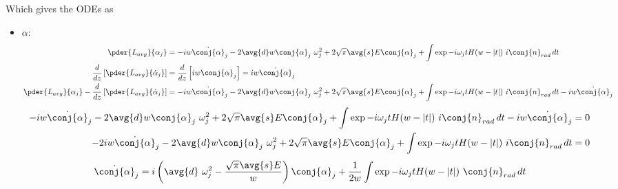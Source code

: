 Which gives the ODEs as
\begin{itemize}
\item $\alpha$:
\begin{equation}
\begin{split}
\pder{L_{avg}}{\alpha_j} &= -iw \dot{\conj{\alpha}}_j - 2 \avg{d} w \conj{\alpha}_j \ \omega_j^2 + 2\sqrt{\pi}\avg{s} E \conj{\alpha}_j + \int{ \exp{-i \omega_j t} H(w-|t|)\ i \conj{n}_{rad}\,dt} \\
\frac{d}{dz}\left[\pder{L_{avg}}{\dot{\alpha}_j}\right] &= \frac{d}{dz} \left[i w \conj{\alpha}_j\right] = i w \dot{\conj{\alpha}}_j\\
\pder{L_{avg}}{\alpha_j} - \frac{d}{dz}\left[\pder{L_{avg}}{\dot{\alpha}_j}\right] &= -iw \dot{\conj{\alpha}}_j - 2 \avg{d} w \conj{\alpha}_j \ \omega_j^2 + 2\sqrt{\pi}\avg{s} E \conj{\alpha}_j + \int{ \exp{-i \omega_j t} H(w-|t|)\ i \conj{n}_{rad}\,dt} - i w \dot{\conj{\alpha}}_j\\
\end{split}
\end{equation}
\begin{equation}
\begin{split}
-iw \dot{\conj{\alpha}}_j - 2 \avg{d} w \conj{\alpha}_j \ \omega_j^2 + 2\sqrt{\pi}\avg{s} E  \conj{\alpha}_j + \int{ \exp{-i \omega_j t} H(w-|t|)\ i \conj{n}_{rad}\,dt} - i w \dot{\conj{\alpha}}_j &= 0 \\
-2iw \dot{\conj{\alpha}}_j - 2 \avg{d} w \conj{\alpha}_j \ \omega_j^2 + 2\sqrt{\pi}\avg{s} E \conj{\alpha}_j + \int{ \exp{-i \omega_j t} H(w-|t|)\ i \conj{n}_{rad}\,dt} &= 0\\
\end{split}
\end{equation}
\begin{equation}
\begin{split}
\dot{\conj{\alpha}}_j &= i \left(\avg{d}\ \omega_j^2 - \frac{\sqrt{\pi}\avg{s} E}{w}\right) \conj{\alpha}_j+ \frac{1}{2w}\int{ \exp{-i \omega_j t} H(w-|t|)\ \conj{n}_{rad}\,dt}\\
\end{split}
\end{equation}



\end{itemize}
